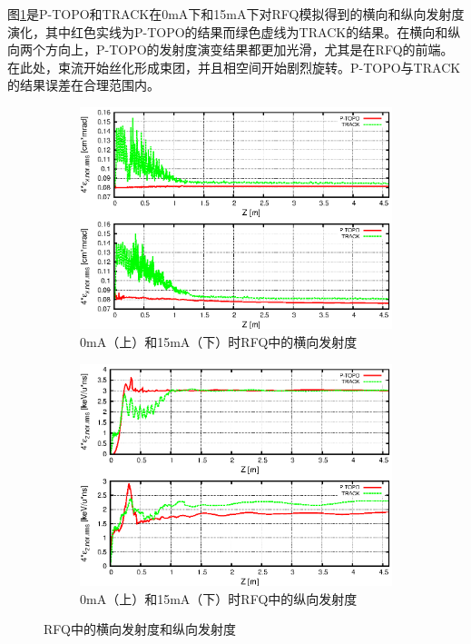 图\ref{fig:ADS_RFQ_emit}是P-TOPO和TRACK在0mA下和15mA下对RFQ模拟得到的横向和纵向发射度演化，其中红色实线为P-TOPO的结果而绿色虚线为TRACK的结果。在横向和纵向两个方向上，P-TOPO的发射度演变结果都更加光滑，尤其是在RFQ的前端。在此处，束流开始丝化形成束团，并且相空间开始剧烈旋转。P-TOPO与TRACK的结果误差在合理范围内。

\begin{figure}[!htb]
    \centering
    \begin{subfigure}[b]{0.9\textwidth}
        \includegraphics[width=\textwidth]{Img/ADS_RFQ_emit1.eps}
        \caption{0mA（上）和15mA（下）时RFQ中的横向发射度}
    \end{subfigure}
    \begin{subfigure}[b]{0.9\textwidth}
        \includegraphics[width=\textwidth]{Img/ADS_RFQ_emit2.eps}
        \caption{0mA（上）和15mA（下）时RFQ中的纵向发射度}
    \end{subfigure}
    \caption{RFQ中的横向发射度和纵向发射度}\label{fig:ADS_RFQ_emit}
\end{figure}


